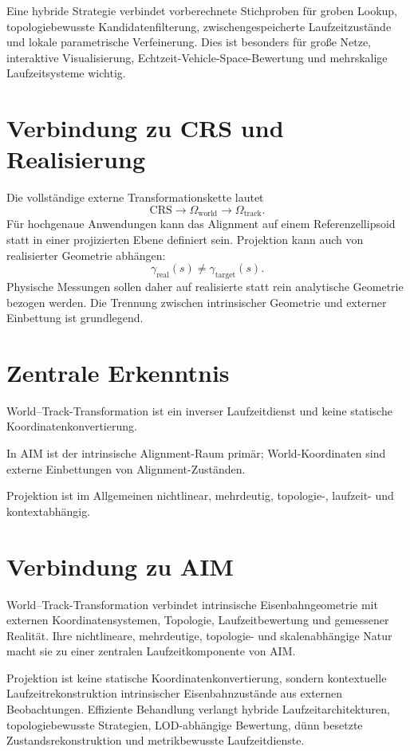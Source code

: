 Eine hybride Strategie verbindet vorberechnete Stichproben für groben Lookup,
topologiebewusste Kandidatenfilterung, zwischengespeicherte Laufzeitzustände
und lokale parametrische Verfeinerung. Dies ist besonders für große Netze,
interaktive Visualisierung, Echtzeit-Vehicle-Space-Bewertung und
mehrskalige Laufzeitsysteme wichtig.

\section{Verbindung zu CRS und Realisierung}

Die vollständige externe Transformationskette lautet
\[
\text{CRS}\rightarrow\Omega_{\mathrm{world}}\rightarrow\Omega_{\mathrm{track}}.
\]
Für hochgenaue Anwendungen kann das Alignment auf einem Referenzellipsoid
statt in einer projizierten Ebene definiert sein. Projektion kann auch von
realisierter Geometrie abhängen:
\[
\gamma_{\mathrm{real}}(s)\neq\gamma_{\mathrm{target}}(s).
\]
Physische Messungen sollen daher auf realisierte statt rein analytische
Geometrie bezogen werden. Die Trennung zwischen intrinsischer Geometrie und
externer Einbettung ist grundlegend.

\section{Zentrale Erkenntnis}

\begin{proposition}
World--Track-Transformation ist ein inverser Laufzeitdienst und keine
statische Koordinatenkonvertierung.
\end{proposition}
\begin{proposition}
In AIM ist der intrinsische Alignment-Raum primär; World-Koordinaten sind
externe Einbettungen von Alignment-Zuständen.
\end{proposition}
\begin{proposition}
Projektion ist im Allgemeinen nichtlinear, mehrdeutig, topologie-,
laufzeit- und kontextabhängig.
\end{proposition}

\section{Verbindung zu AIM}

\begin{summary}
World--Track-Transformation verbindet intrinsische Eisenbahngeometrie mit
externen Koordinatensystemen, Topologie, Laufzeitbewertung und gemessener
Realität. Ihre nichtlineare, mehrdeutige, topologie- und skalenabhängige Natur
macht sie zu einer zentralen Laufzeitkomponente von AIM.

Projektion ist keine statische Koordinatenkonvertierung, sondern kontextuelle
Laufzeitrekonstruktion intrinsischer Eisenbahnzustände aus externen
Beobachtungen. Effiziente Behandlung verlangt hybride Laufzeitarchitekturen,
topologiebewusste Strategien, LOD-abhängige Bewertung, dünn besetzte
Zustandsrekonstruktion und metrikbewusste Laufzeitdienste.
\end{summary}
